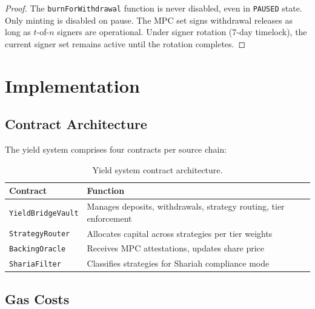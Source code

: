 \documentclass[11pt,twocolumn]{article}
\begin{document}
\begin{proof}
The \texttt{burnForWithdrawal} function is never disabled, even in \texttt{PAUSED} state. Only minting is disabled on pause. The MPC set signs withdrawal releases as long as $t$-of-$n$ signers are operational. Under signer rotation (7-day timelock), the current signer set remains active until the rotation completes.
\end{proof}

\section{Implementation}\label{sec:implementation}

\subsection{Contract Architecture}

The yield system comprises four contracts per source chain:

\begin{table}[ht]
\centering
\small
\caption{Yield system contract architecture.}
\label{tab:contracts}
\begin{tabular}{@{}lp{4.8cm}@{}}
\toprule
\textbf{Contract} & \textbf{Function} \\
\midrule
\texttt{YieldBridgeVault} & Manages deposits, withdrawals, strategy routing, tier enforcement \\
\texttt{StrategyRouter} & Allocates capital across strategies per tier weights \\
\texttt{BackingOracle} & Receives MPC attestations, updates share price \\
\texttt{ShariaFilter} & Classifies strategies for Shariah compliance mode \\
\bottomrule
\end{tabular}
\end{table}

\subsection{Gas Costs}
\end{document}
